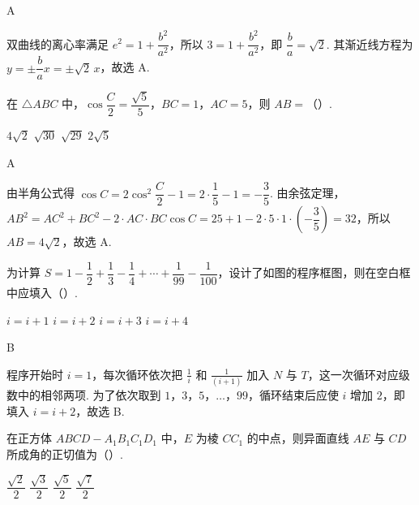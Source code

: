 \begin{answer}
A
\end{answer}

\begin{solution}
双曲线的离心率满足 \(e^2=1+\dfrac{b^2}{a^2}\)，所以 \(3=1+\dfrac{b^2}{a^2}\)，即 \(\dfrac ba=\sqrt2\). 其渐近线方程为 \(y=\pm\dfrac ba x=\pm\sqrt2\,x\)，故选 A.
\end{solution}

\begin{problem}
在 \(\triangle ABC\) 中，\(\cos\dfrac{C}{2}=\dfrac{\sqrt5}{5}\)，\(BC=1\)，\(AC=5\)，则 \(AB=\)（\quad）.

\choices
    {\(4\sqrt2\)}
    {\(\sqrt{30}\)}
    {\(\sqrt{29}\)}
    {\(2\sqrt5\)}
\end{problem}

\begin{answer}
A
\end{answer}

\begin{solution}
由半角公式得 \(\cos C=2\cos^2\dfrac C2-1=2\cdot\dfrac15-1=-\dfrac35\). 由余弦定理，
\(AB^2=AC^2+BC^2-2\cdot AC\cdot BC\cos C=25+1-2\cdot5\cdot1\cdot\left(-\dfrac35\right)=32\)，所以 \(AB=4\sqrt2\)，故选 A.
\end{solution}

\begin{problem}
为计算 \(S=1-\dfrac12+\dfrac13-\dfrac14+\cdots+\dfrac1{99}-\dfrac1{100}\)，设计了如图的程序框图，则在空白框中应填入（\quad）.


\choices
    {\(i=i+1\)}
    {\(i=i+2\)}
    {\(i=i+3\)}
    {\(i=i+4\)}
\end{problem}

\begin{answer}
B
\end{answer}

\begin{solution}
程序开始时 \(i=1\)，每次循环依次把 \(\frac{1}{i}\) 和 \(\frac{1}{(i+1)}\) 加入 \(N\) 与 \(T\)，这一次循环对应级数中的相邻两项. 为了依次取到 \(1\)，\(3\)，\(5\)，\(\ldots\)，\(99\)，循环结束后应使 \(i\) 增加 \(2\)，即填入 \(i=i+2\)，故选 B.
\end{solution}

\begin{problem}
在正方体 \(ABCD-A_1B_1C_1D_1\) 中，\(E\) 为棱 \(CC_1\) 的中点，则异面直线 \(AE\) 与 \(CD\) 所成角的正切值为（\quad）.

\choices
    {\(\dfrac{\sqrt2}{2}\)}
    {\(\dfrac{\sqrt3}{2}\)}
    {\(\dfrac{\sqrt5}{2}\)}
    {\(\dfrac{\sqrt7}{2}\)}
\end{problem}

